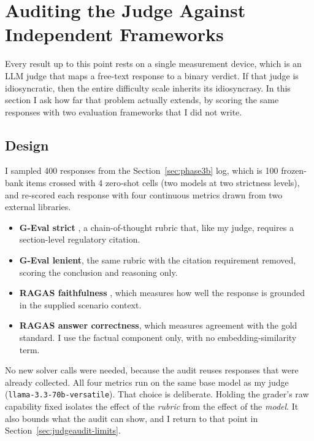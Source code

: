 \section{Auditing the Judge Against Independent Frameworks}
\label{sec:judgeaudit}

Every result up to this point rests on a single measurement device, which
is an LLM judge that maps a free-text response to a binary verdict. If
that judge is idiosyncratic, then the entire difficulty scale inherits
its idiosyncrasy. In this section I ask how far that problem actually
extends, by scoring the same responses with two evaluation frameworks
that I did not write.

\subsection{Design}
I sampled 400 responses from the Section~\ref{sec:phase3b} log, which is
100 frozen-bank items crossed with 4 zero-shot cells (two models at two
strictness levels), and re-scored each response with four continuous
metrics drawn from two external libraries.

\begin{itemize}[nosep,leftmargin=1.4em]
  \item \textbf{G-Eval strict} \citep{liu2023geval}, a chain-of-thought
        rubric that, like my judge, requires a section-level regulatory
        citation.
  \item \textbf{G-Eval lenient}, the same rubric with the citation
        requirement removed, scoring the conclusion and reasoning only.
  \item \textbf{RAGAS faithfulness} \citep{es2024ragas}, which measures
        how well the response is grounded in the supplied scenario
        context.
  \item \textbf{RAGAS answer correctness}, which measures agreement with
        the gold standard. I use the factual component only, with no
        embedding-similarity term.
\end{itemize}

No new solver calls were needed, because the audit reuses responses that
were already collected. All four metrics run on the same base model as my
judge (\texttt{llama-3.3-70b-versatile}). That choice is deliberate.
Holding the grader's raw capability fixed isolates the effect of the
\emph{rubric} from the effect of the \emph{model}. It also bounds what
the audit can show, and I return to that point in
Section~\ref{sec:judgeaudit-limits}.

